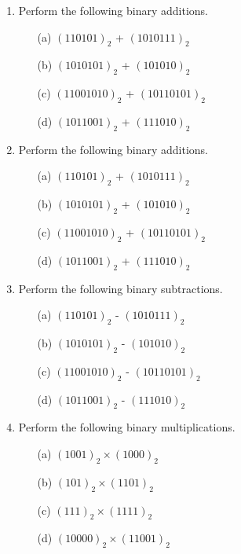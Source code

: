 \documentclass[]{report}
\begin{document}
\begin{enumerate}
\item Perform the following binary additions.
  \begin{multicols}{2}
    \begin{itemize}
    \item[(a)] $(110101)_{2}$ + $(1010111)_{2}$
    \item[(b)] $(1010101)_{2}$ + $(101010)_{2}$
    \item[(c)] $(11001010)_{2}$ + $(10110101)_{2}$
    \item[(d)] $(1011001)_{2}$ + $(111010)_{2}$
    \end{itemize}
  \end{multicols}
  
  

	\item Perform the following binary additions.
	\begin{multicols}{2}
		\begin{itemize}
			\item[(a)] $(110101)_{2}$ + $(1010111)_{2}$
			\item[(b)] $(1010101)_{2}$ + $(101010)_{2}$
			\item[(c)] $(11001010)_{2}$ + $(10110101)_{2}$
			\item[(d)] $(1011001)_{2}$ + $(111010)_{2}$
		\end{itemize}
	\end{multicols}
	
	\item Perform the following binary subtractions.
	\begin{multicols}{2}
		\begin{itemize}
			\item[(a)] $(110101)_{2}$ - $(1010111)_{2}$
			\item[(b)] $(1010101)_{2}$ - $(101010)_{2}$
			\item[(c)] $(11001010)_{2}$ - $(10110101)_{2}$
			\item[(d)] $(1011001)_{2}$ - $(111010)_{2}$
		\end{itemize}
\end{multicols}



\item Perform the following binary multiplications.
\begin{multicols}{2}
\begin{itemize}
\item[(a)] $(1001)_{2}\times( 1000)_{2}$  %
\item[(b)] $(101)_{2}\times(1101)_{2}$ %
\item[(c)] $(111)_{2}\times(1111)_{2}$ %
\item[(d)] $(10000)_{2}\times(11001)_{2}$    %
\end{itemize}  
  \end{multicols}


\end{enumerate}
\end{document}

